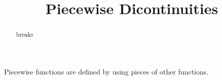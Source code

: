 \documentclass{ximera}
\title{Piecewise Dicontinuities}
\begin{document}
\begin{abstract}
breaks
\end{abstract}
\maketitle



Piecewise functions are defined by using pieces of other functions.
\end{document}
